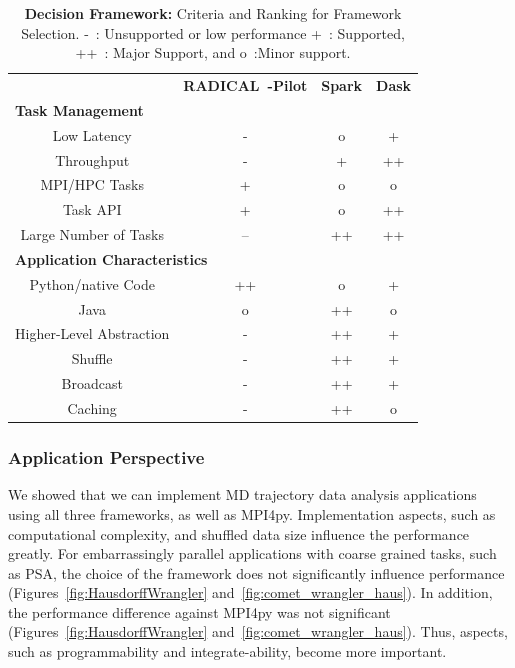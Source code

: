 \begin{table}[t]
    \centering
    \begin{tabular}{@{}cccc@{}}
        \toprule
        &\textbf{RADICAL~-Pilot}     &\textbf{Spark} &\textbf{Dask}\\
        \multicolumn{4}{l}{\textbf{Task Management}} \\
        \midrule
        Low Latency   &- &o &+\\
        Throughput    &- &+ &++\\
        MPI/HPC Tasks &+ &o &o\\
        Task API   &+ &o &++\\
        Large Number of Tasks   &-- &++ &++\\\hline
        \multicolumn{4}{l}{\textbf{Application Characteristics}}\\\midrule
        Python/native Code &++ &o &+\\
        Java               &o &++ &o\\
        Higher-Level Abstraction &- &++ &+\\
        Shuffle                  &- &++ &+\\
        Broadcast                &- &++ &+\\
        Caching                  &- &++ &o\\
        \bottomrule
    \end{tabular}
    \caption{\textbf{Decision Framework:} Criteria and Ranking for Framework Selection. -~: Unsupported or low performance
        +~: Supported, ++~: Major Support, and o~:Minor support.\label{tab:framework}}
\end{table}

\subsubsection*{Application Perspective}
We showed that we can implement MD trajectory data analysis applications using all three frameworks, as well as MPI4py.
Implementation aspects, such as computational complexity, and shuffled data size influence the performance greatly.
For embarrassingly parallel applications with coarse grained tasks, such as PSA, the choice of the framework does not significantly influence performance (Figures~\ref{fig:HausdorffWrangler} and~\ref{fig:comet_wrangler_haus}).
In addition, the performance difference against MPI4py was not significant (Figures~\ref{fig:HausdorffWrangler} and~\ref{fig:comet_wrangler_haus}).
Thus, aspects, such as programmability and integrate-ability, become more important.


